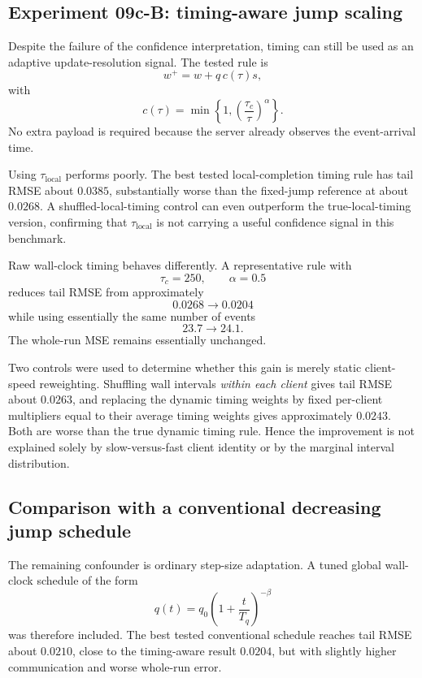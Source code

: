 \subsection{Experiment 09c-B: timing-aware jump scaling}
Despite the failure of the confidence interpretation, timing can still be used as an adaptive update-resolution signal. The tested rule is
\begin{equation}
  w^+=w+q\,c(\tau)s,
\end{equation}
with
\begin{equation}
  c(\tau)=\min\left\{1,\left(\frac{\tau_c}{\tau}\right)^\alpha\right\}.
\end{equation}
No extra payload is required because the server already observes the event-arrival time.

Using \(\tau_{\mathrm{local}}\) performs poorly. The best tested local-completion timing rule has tail RMSE about \(0.0385\), substantially worse than the fixed-jump reference at about \(0.0268\). A shuffled-local-timing control can even outperform the true-local-timing version, confirming that \(\tau_{\mathrm{local}}\) is not carrying a useful confidence signal in this benchmark.

Raw wall-clock timing behaves differently. A representative rule with
\begin{equation}
  \tau_c=250,
  \qquad
  \alpha=0.5
\end{equation}
reduces tail RMSE from approximately
\begin{equation}
  0.0268 \rightarrow 0.0204
\end{equation}
while using essentially the same number of events
\begin{equation}
  23.7 \rightarrow 24.1.
\end{equation}
The whole-run MSE remains essentially unchanged.

Two controls were used to determine whether this gain is merely static client-speed reweighting. Shuffling wall intervals \emph{within each client} gives tail RMSE about \(0.0263\), and replacing the dynamic timing weights by fixed per-client multipliers equal to their average timing weights gives approximately \(0.0243\). Both are worse than the true dynamic timing rule. Hence the improvement is not explained solely by slow-versus-fast client identity or by the marginal interval distribution.

\subsection{Comparison with a conventional decreasing jump schedule}
The remaining confounder is ordinary step-size adaptation. A tuned global wall-clock schedule of the form
\begin{equation}
  q(t)=q_0\left(1+\frac{t}{T_q}\right)^{-\beta}
\end{equation}
was therefore included. The best tested conventional schedule reaches tail RMSE about \(0.0210\), close to the timing-aware result \(0.0204\), but with slightly higher communication and worse whole-run error.

